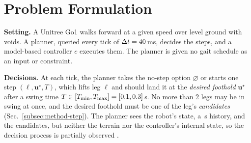 \section{Problem Formulation}
\label{sec:setup}

\noindent\textbf{Setting.}
 A Unitree Go1 walks forward at a given speed over level
ground with voids. A planner, queried every tick of
$\Delta t = 40$\,ms, decides the steps, and a
model-based controller $c$ executes them. The planner is given no
gait schedule %
as an input or constraint.

\noindent\textbf{Decisions.}
 At each tick, the planner takes the no-step option
$\varnothing$ or starts one step \mbox{$(\ell, \mathbf u^\star, T)$},
which lifts leg $\ell$ and should land it at the \emph{desired foothold}
$\mathbf u^\star$ after a swing time $T \in [T_{\min}, T_{\max}] =
[0.1, 0.3]$\,s. %
No more than 2 legs may be in swing at once,
and the desired foothold must be one of the leg's \emph{candidates}
(Sec.~\ref{subsec:method-step}). The planner sees the robot's state, a
\corlHistSeconds\,s history, and the candidates, but neither the %
terrain nor the controller's internal state, so the decision process
is partially observed \citep{yang_fast_2021}.

